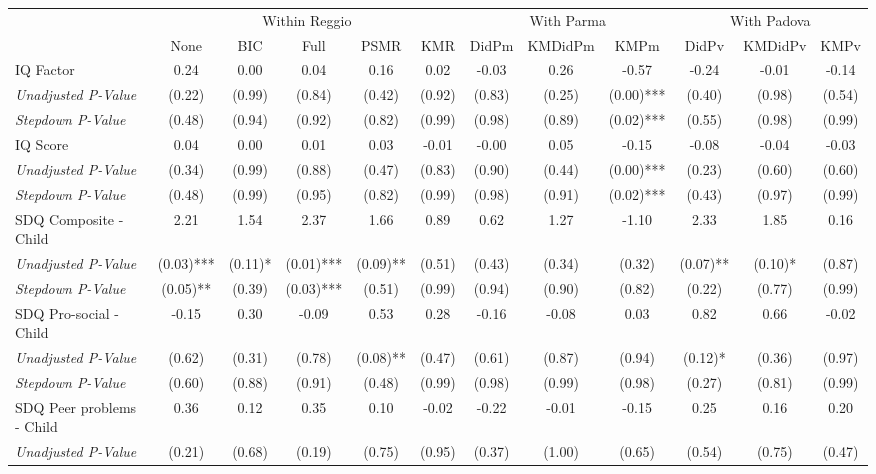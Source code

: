 \begin{tabular}{l c c c c c c c c c c c}
\toprule
& \multicolumn{5}{c}{Within Reggio} & \multicolumn{3}{c}{With Parma} & \multicolumn{3}{c}{With Padova} \\\cmidrule(lr){2-6} \cmidrule(lr){7-9} \cmidrule(lr){10-12}
 & None & BIC & Full & PSMR & KMR & DidPm & KMDidPm & KMPm & DidPv & KMDidPv & KMPv \\
\midrule
IQ Factor & 0.24 & 0.00 & 0.04 & 0.16 & 0.02 & -0.03 & 0.26 & -0.57 & -0.24 & -0.01 & -0.14 \\
\quad \textit{Unadjusted P-Value} & (0.22) & (0.99) & (0.84) & (0.42) & (0.92) & (0.83) & (0.25) & (0.00)*** & (0.40) & (0.98) & (0.54) \\
\quad \textit{Stepdown P-Value} & (0.48) & (0.94) & (0.92) & (0.82) & (0.99) & (0.98) & (0.89) & (0.02)*** & (0.55) & (0.98) & (0.99) \\
IQ Score & 0.04 & 0.00 & 0.01 & 0.03 & -0.01 & -0.00 & 0.05 & -0.15 & -0.08 & -0.04 & -0.03 \\
\quad \textit{Unadjusted P-Value} & (0.34) & (0.99) & (0.88) & (0.47) & (0.83) & (0.90) & (0.44) & (0.00)*** & (0.23) & (0.60) & (0.60) \\
\quad \textit{Stepdown P-Value} & (0.48) & (0.99) & (0.95) & (0.82) & (0.99) & (0.98) & (0.91) & (0.02)*** & (0.43) & (0.97) & (0.99) \\
SDQ Composite - Child & 2.21 & 1.54 & 2.37 & 1.66 & 0.89 & 0.62 & 1.27 & -1.10 & 2.33 & 1.85 & 0.16 \\
\quad \textit{Unadjusted P-Value} & (0.03)*** & (0.11)* & (0.01)*** & (0.09)** & (0.51) & (0.43) & (0.34) & (0.32) & (0.07)** & (0.10)* & (0.87) \\
\quad \textit{Stepdown P-Value} & (0.05)** & (0.39) & (0.03)*** & (0.51) & (0.99) & (0.94) & (0.90) & (0.82) & (0.22) & (0.77) & (0.99) \\
SDQ Pro-social - Child & -0.15 & 0.30 & -0.09 & 0.53 & 0.28 & -0.16 & -0.08 & 0.03 & 0.82 & 0.66 & -0.02 \\
\quad \textit{Unadjusted P-Value} & (0.62) & (0.31) & (0.78) & (0.08)** & (0.47) & (0.61) & (0.87) & (0.94) & (0.12)* & (0.36) & (0.97) \\
\quad \textit{Stepdown P-Value} & (0.60) & (0.88) & (0.91) & (0.48) & (0.99) & (0.98) & (0.99) & (0.98) & (0.27) & (0.81) & (0.99) \\
SDQ Peer problems - Child & 0.36 & 0.12 & 0.35 & 0.10 & -0.02 & -0.22 & -0.01 & -0.15 & 0.25 & 0.16 & 0.20 \\
\quad \textit{Unadjusted P-Value} & (0.21) & (0.68) & (0.19) & (0.75) & (0.95) & (0.37) & (1.00) & (0.65) & (0.54) & (0.75) & (0.47) \\

\end{tabular}
